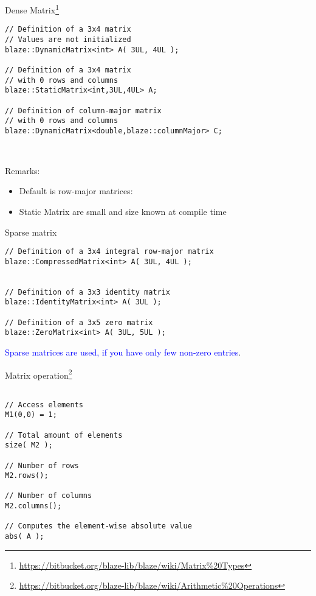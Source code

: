 \documentclass[12pt,t]{beamer}
\begin{document}
\begin{frame}[fragile]{Dense Matrix\footnote{\tiny\url{https://bitbucket.org/blaze-lib/blaze/wiki/Matrix\%20Types}}}
\begin{lstlisting}
// Definition of a 3x4 matrix 
// Values are not initialized
blaze::DynamicMatrix<int> A( 3UL, 4UL );

// Definition of a 3x4 matrix
// with 0 rows and columns
blaze::StaticMatrix<int,3UL,4UL> A;

// Definition of column-major matrix
// with 0 rows and columns
blaze::DynamicMatrix<double,blaze::columnMajor> C;



\end{lstlisting}

\begin{block}{Remarks:}
\begin{itemize}
\item Default is row-major matrices:
\item Static Matrix are small and size known at compile time
\end{itemize}
\end{block}
\end{frame}


\begin{frame}[fragile]{Sparse matrix}
\begin{lstlisting}
// Definition of a 3x4 integral row-major matrix
blaze::CompressedMatrix<int> A( 3UL, 4UL );


// Definition of a 3x3 identity matrix
blaze::IdentityMatrix<int> A( 3UL );

// Definition of a 3x5 zero matrix
blaze::ZeroMatrix<int> A( 3UL, 5UL );
\end{lstlisting}

\begin{center}
\textcolor{blue}{Sparse matrices are used, if you have only few non-zero entries}.
\end{center}
\end{frame}

\begin{frame}[fragile]{Matrix operation\footnote{\tiny\url{https://bitbucket.org/blaze-lib/blaze/wiki/Arithmetic\%20Operations}}}
\begin{lstlisting}

// Access elements
M1(0,0) = 1;

// Total amount of elements
size( M2 );

// Number of rows
M2.rows(); 

// Number of columns
M2.columns(); 

// Computes the element-wise absolute value
abs( A );
\end{lstlisting}
\end{frame}
\end{document}
